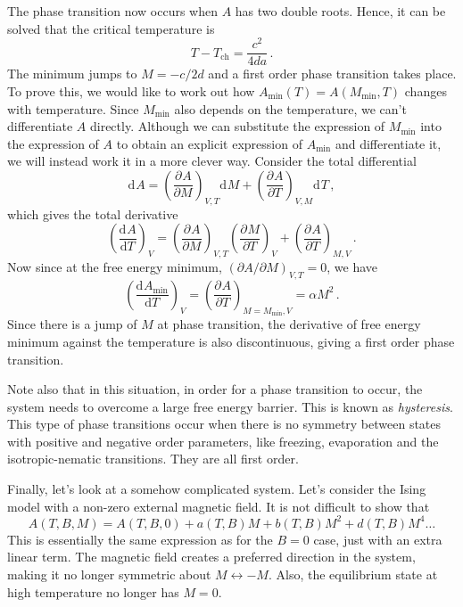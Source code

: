 \documentclass{article}
\theoremstyle{plain}\theoremheaderfont{\normalfont\bfseries}\theorembodyfont{\rmfamily}\theoremseparator{.}\newtheorem*{thm}{Theorem}\newtheorem*{law}{Law}\newtheorem*{pos}{Postulate}
\numberwithin{equation}{section}
\renewcommand{\d}[2][]{\mathrm{d}^{#1} #2}
\newcommand{\dv}[3][]{\frac{\mathrm{d}^{#1} #2}{{\mathrm{d} #3}^{#1}}}
\newcommand{\pdv}[3][]{\frac{\partial^{#1} #2}{{\partial #3}^{#1}}}
\begin{document}
    The phase transition now occurs when \(A\) has two double roots. Hence, it can be solved that the critical temperature is
    \begin{equation}
        T-T_{\text{ch}}=\frac{c^2}{4da}\,.
    \end{equation}
    The minimum jumps to \(M=-c/2d\) and a first order phase transition takes place. To prove this, we would like to work out how \(A_{\text{min}}(T)=A(M_{\text{min}},T)\) changes with temperature. Since \(M_{\text{min}}\) also depends on the temperature, we can't differentiate \(A\) directly. Although we can substitute the expression of \(M_{\text{min}}\) into the expression of \(A\) to obtain an explicit expression of \(A_{\text{min}}\) and differentiate it, we will instead work it in a more clever way. Consider the total differential
    \begin{equation}
        \d{A}=\left(\pdv{A}{M}\right)_{V,T}\d{M}+\left(\pdv{A}{T}\right)_{V,M}\d{T}\,,
    \end{equation}
    which gives the total derivative
    \begin{equation}
        \left(\dv{A}{T}\right)_{V}=\left(\pdv{A}{M}\right)_{V,T}\left(\pdv{M}{T}\right)_{V}+\left(\pdv{A}{T}\right)_{M,V}\,.
    \end{equation}
    Now since at the free energy minimum, \((\partial A/\partial M)_{V,T}=0\), we have
    \begin{equation}
        \left(\dv{A_{\text{min}}}{T}\right)_{V}=\left(\pdv{A}{T}\right)_{M=M_{\text{min}},V}=\alpha M^2\,.
    \end{equation}
    Since there is a jump of \(M\) at phase transition, the derivative of free energy minimum against the temperature is also discontinuous, giving a first order phase transition.   
    
    Note also that in this situation, in order for a phase transition to occur, the system needs to overcome a large free energy barrier. This is known as \textit{hysteresis}. This type of phase transitions occur when there is no symmetry between states with positive and negative order parameters, like freezing, evaporation and the isotropic-nematic transitions. They are all first order.

    Finally, let's look at a somehow complicated system. Let's consider the Ising model with a non-zero external magnetic field. It is not difficult to show that
    \begin{equation}
        A(T,B,M)=A(T,B,0)+a(T,B)M+b(T,B)M^2+d(T,B)M^4\dots
    \end{equation}
    This is essentially the same expression as for the \(B=0\) case, just with an extra linear term. The magnetic field creates a preferred direction in the system, making it no longer symmetric about \(M\leftrightarrow -M\). Also, the equilibrium state at high temperature no longer has \(M=0\).
\end{document}
